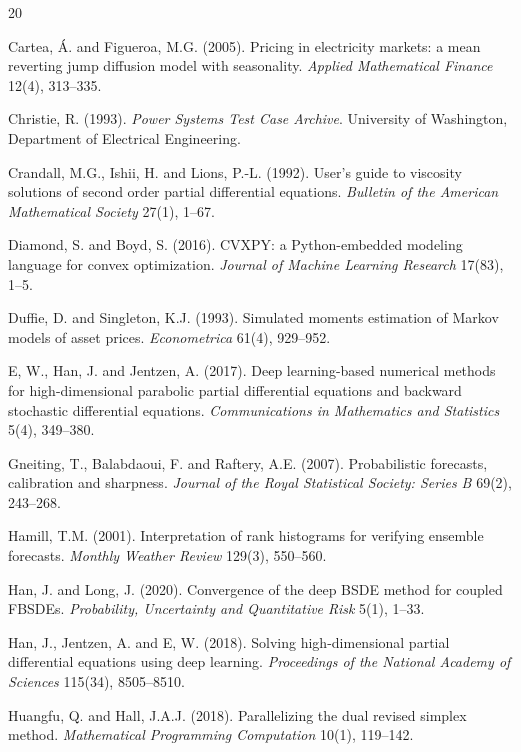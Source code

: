 \documentclass[11pt]{article}
\begin{document}
\begin{thebibliography}{20}

 Cartea, \'A. and Figueroa, M.G. (2005).
Pricing in electricity markets: a mean reverting jump diffusion model with
seasonality. \emph{Applied Mathematical Finance} 12(4), 313--335.

 Christie, R. (1993).
\emph{Power Systems Test Case Archive}. University of Washington,
Department of Electrical Engineering.

 Crandall, M.G., Ishii, H. and Lions, P.-L. (1992).
User's guide to viscosity solutions of second order partial differential
equations. \emph{Bulletin of the American Mathematical Society} 27(1),
1--67.

 Diamond, S. and Boyd, S. (2016).
CVXPY: a Python-embedded modeling language for convex optimization.
\emph{Journal of Machine Learning Research} 17(83), 1--5.

 Duffie, D. and Singleton, K.J. (1993).
Simulated moments estimation of Markov models of asset prices.
\emph{Econometrica} 61(4), 929--952.

 E, W., Han, J. and Jentzen, A. (2017).
Deep learning-based numerical methods for high-dimensional parabolic
partial differential equations and backward stochastic differential
equations. \emph{Communications in Mathematics and Statistics} 5(4),
349--380.

 Gneiting, T., Balabdaoui, F. and Raftery, A.E.
(2007). Probabilistic forecasts, calibration and sharpness.
\emph{Journal of the Royal Statistical Society: Series B} 69(2), 243--268.

 Hamill, T.M. (2001).
Interpretation of rank histograms for verifying ensemble forecasts.
\emph{Monthly Weather Review} 129(3), 550--560.

 Han, J. and Long, J. (2020).
Convergence of the deep BSDE method for coupled FBSDEs.
\emph{Probability, Uncertainty and Quantitative Risk} 5(1), 1--33.

 Han, J., Jentzen, A. and E, W. (2018).
Solving high-dimensional partial differential equations using deep
learning. \emph{Proceedings of the National Academy of Sciences} 115(34),
8505--8510.

 Huangfu, Q. and Hall, J.A.J. (2018).
Parallelizing the dual revised simplex method.
\emph{Mathematical Programming Computation} 10(1), 119--142.


\end{thebibliography}
\end{document}
